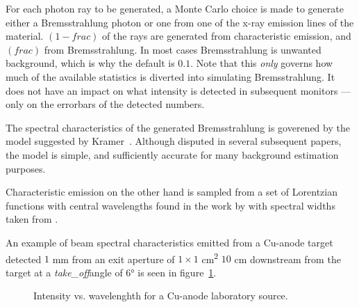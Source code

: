 For each photon ray to be generated, a Monte Carlo choice is made to
generate either a Bremsstrahlung photon or one from one of the x-ray emission
lines of the material. $( 1-\mathit{frac} )$ of the rays are generated from characteristic
emission, and $( \mathit{frac} )$ from Bremsstrahlung. In most cases Bremsstrahlung is
unwanted background, which is why the default is $0.1$. Note that this
\emph{only} governs how much of the available statistics is diverted into
simulating Bremsstrahlung. It does not have an impact on what intensity is detected
in subsequent monitors --- only on the errorbars of the detected numbers.

The spectral characteristics of the generated Bremsstrahlung is goverened by
the model suggested by Kramer~\cite{kramers1923}. Although disputed in several
subsequent papers, the model is simple, and sufficiently accurate for many
background estimation purposes.

Characteristic emission on the other hand is sampled from a set of Lorentzian
functions with central wavelengths found in the work by \cite{bearden1967x} with
spectral widths taken from \cite{krause1979natural}.

An example of beam spectral characteristics emitted from a Cu-anode target
detected $1$ mm  from an exit aperture of $1\times 1$ \si{cm\squared} $10$ \si{cm} downstream from the
target at a \textit{take\_off}angle of $6\si{\degree}$ is seen in
figure~\ref{f:source_lab_spectrum}.
\begin{figure}
\label{f:source_lab_spectrum}
\caption{Intensity vs. wavelenghth for a Cu-anode laboratory source.}
\end{figure}

